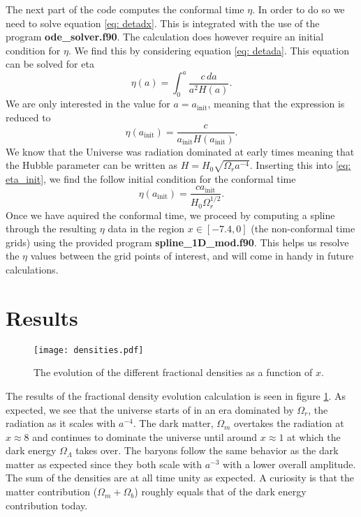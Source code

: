 \documentclass[a4paper, 10pt, reqno]{amsart}
\begin{document}
The next part of the code computes the conformal time $\eta$. In order
to do so we need to solve equation \eqref{eq: detadx}. This is
integrated with the use of the program \textbf{ode\_solver.f90}. The
calculation does however require an initial condition for $\eta$. We
find this by considering equation \eqref{eq: detada}. This equation can
be solved for eta
\begin{equation}
    \eta(a) = \int_0^a \frac{c \, da}{a^2 H(a)}.
\end{equation}
We are only interested in the value for $a = a_\text{init}$, meaning
that the expression is reduced to
\begin{equation}\label{eq: eta_init}
    \eta(a_\text{init}) = \frac{c} {a_\text{init} H(a_\text{init})}.
\end{equation}
We know that the Universe was radiation dominated at early times
meaning that the Hubble parameter can be written as $H = H_0
\sqrt{\Omega_r a^{-4}}$. Inserting this into \eqref{eq: eta_init},
we find the follow initial condition for the conformal time
\begin{equation}
    \eta(a_\text{init}) = \frac{c a_\text{init}}{H_0 \Omega_r^{1/2}}.
\end{equation}
Once we have aquired the conformal time, we proceed by computing a spline through the resulting $\eta$ data in
the region $x \in [-7.4, 0]$ (the non-conformal time grids) using the provided program
\textbf{spline\_1D\_mod.f90}. This helps us
resolve the $\eta$ values between the grid points of interest, and will
come in handy in future calculations.

\section{Results}

\begin{figure}
    \centering
    \texttt{[image: densities.pdf]}
    \caption{The evolution of the different fractional densities as a
    function of $x$.}
    \label{fig: dens}
\end{figure}

The results of the fractional density evolution calculation is seen in
figure \ref{fig: dens}. As expected, we see that the universe starts of
in an era dominated by $\Omega_r$, the radiation as it scales with $a^{-4}$. The dark matter,
$\Omega_m$ overtakes the radiation at $x \approx 8$ and continues to
dominate the universe until around $x \approx 1 $ at which the dark
energy $\Omega_\Lambda$ takes over. The baryons follow the same
behavior as the dark matter as expected since they both scale with
$a^{-3}$ with a lower overall amplitude. The sum of the densities are at all time unity as expected. A curiosity is that the matter contribution ($\Omega_m + \Omega_b$) roughly equals that of the dark energy contribution today.
\end{document}
